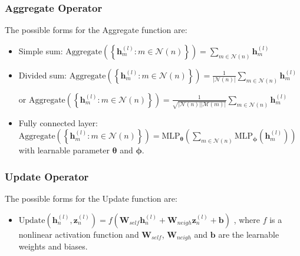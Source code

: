 \documentclass{article}
\begin{document}
        \subsubsection{Aggregate Operator}
            The possible forms for the Aggregate function are:
            \begin{itemize}
                \item Simple sum: $\displaystyle \text{Aggregate}\left(\left\{ \textbf{h}_m^{(l)}:m \in \mathcal N(n) \right\}\right)=\sum_{m \in \mathcal N(n)} \textbf{h}_m^{(l)}$
                \item Divided sum: $\displaystyle \text{Aggregate}\left(\left\{ \textbf{h}_m^{(l)}:m \in \mathcal N(n) \right\}\right)=\frac{1}{|\mathcal N(n)|}\sum_{m \in \mathcal N(n)} \textbf{h}_m^{(l)}$
                
                    or $\displaystyle \text{Aggregate}\left(\left\{ \textbf{h}_m^{(l)}:m \in \mathcal N(n) \right\}\right)=\frac{1}{\sqrt{|\mathcal N(n)||\mathcal M(m)|}}\sum_{m \in \mathcal N(n)} \textbf{h}_m^{(l)}$
                \item Fully connected layer: $\displaystyle \text{Aggregate}\left(\left\{ \textbf{h}_m^{(l)}:m \in \mathcal N(n) \right\}\right)=\text{MLP}_{\bm{\theta}}\left(\sum_{m \in \mathcal N(n)} \text{MLP}_{\bm{\phi}}(\textbf{h}_m^{(l)})\right)$
                with learnable parameter $\bm{\theta}$ and $\bm{\phi}$.
            \end{itemize}
            
        \subsubsection{Update Operator}
            The possible forms for the Update function are:
            \begin{itemize}
                \item $\text{Update}\left(\textbf{h}_n^{(l)},\textbf{z}_n^{(l)}\right)=f(\textbf{W}_{self}\textbf{h}_n^{(l)}+\textbf{W}_{neigh}\textbf{z}_n^{(l)}+\textbf{b})$
                , where $f$ is a nonlinear activation function and $\textbf{W}_{self}$, $\textbf{W}_{neigh}$ and $\textbf{b}$ are the learnable weights and biases. 
            \end{itemize}
\end{document}

